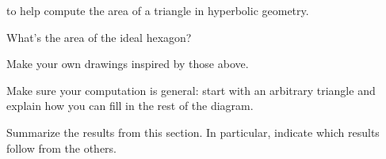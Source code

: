 \documentclass[newpage,hints,12pt,nooutcomes,noauthor,handout]{ximera}
\begin{document}
\begin{problem}
\begin{center}
\end{center}
  to help compute the area of a triangle in hyperbolic geometry.
  \begin{hint}
    What's the area of the ideal hexagon?
  \end{hint}
  \begin{hint}
    Make your own drawings inspired by those above.
  \end{hint}
  \begin{hint}
    Make sure your computation is general: start with an arbitrary triangle and
    explain how you can fill in the rest of the diagram.
  \end{hint}
\end{problem}


\begin{problem}
Summarize the results from this section. In particular, indicate which
results follow from the others.
\begin{freeResponse}
\end{freeResponse}
\end{problem}
\end{document}
